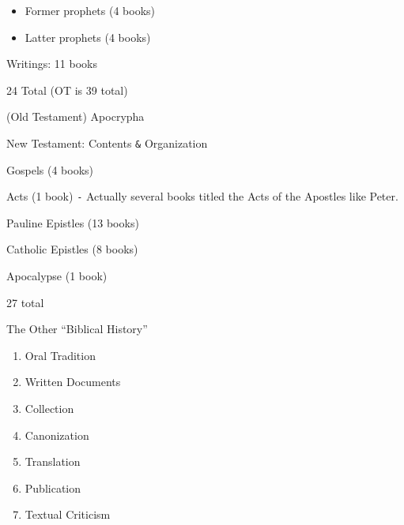 \documentclass{article}
\begin{document}
    \begin{itemize}
        \item Former prophets (4 books)
        \item Latter prophets (4 books)
    \end{itemize}

    Writings: 11 books

    24 Total (OT is 39 total)

    (Old Testament) Apocrypha

\centerline{New Testament: Contents \texttt{\&} Organization}

    Gospels (4 books)

    Acts (1 book) \texttt{-} Actually several books titled the Acts of the Apostles like Peter.

    Pauline Epistles (13 books)

    Catholic Epistles (8 books)

    Apocalypse (1 book)

    27 total

\centerline{The Other ``Biblical History''}

    \begin{enumerate}
        \item Oral Tradition
        \item Written Documents
        \item Collection
        \item Canonization
        \item Translation
        \item Publication
        \item Textual Criticism
    \end{enumerate}
\end{document}
